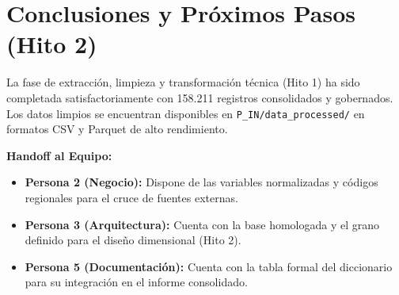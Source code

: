 \documentclass[11pt,a4paper]{article}
\begin{document}
\section{Conclusiones y Próximos Pasos (Hito 2)}
La fase de extracción, limpieza y transformación técnica (Hito 1) ha sido completada satisfactoriamente con 158.211 registros consolidados y gobernados. Los datos limpios se encuentran disponibles en \texttt{P\_IN/data\_processed/} en formatos CSV y Parquet de alto rendimiento.

\textbf{Handoff al Equipo:}
\begin{itemize}
    \item \textbf{Persona 2 (Negocio):} Dispone de las variables normalizadas y códigos regionales para el cruce de fuentes externas.
    \item \textbf{Persona 3 (Arquitectura):} Cuenta con la base homologada y el grano definido para el diseño dimensional (Hito 2).
    \item \textbf{Persona 5 (Documentación):} Cuenta con la tabla formal del diccionario para su integración en el informe consolidado.
\end{itemize}
\end{document}
